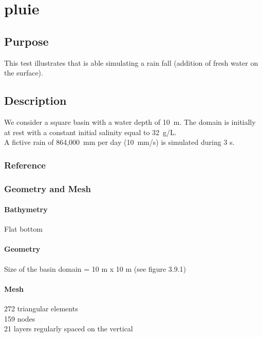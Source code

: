 \chapter{pluie}
%
%
\section{Purpose}
%
This test illustrates that  is able simulating a rain fall
(addition of fresh water on the surface).
%
\section{Description}
%
We consider a square basin with a water depth of 10~m.
The domain is initially at rest with a constant initial salinity equal
to 32~g/L.\\
A fictive rain of 864,000~mm per day (10~mm/s) is simulated during 3 s.
%
%
%
%
\subsection{Reference}
%

%
%
%
\subsection{Geometry and Mesh}
%
\subsubsection{Bathymetry}
%
Flat bottom
%
\subsubsection{Geometry}
%
Size of the basin domain = 10 m x 10 m (see figure 3.9.1)
%
\subsubsection{Mesh}
%
272 triangular elements\\
159 nodes\\
21 layers regularly spaced on the vertical
%
%
%

